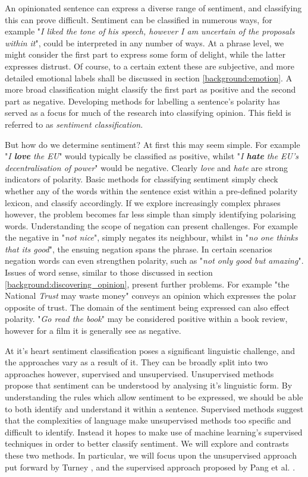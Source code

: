 An opinionated sentence can express a diverse range of sentiment, and classifying this can prove difficult. Sentiment can be classified in numerous ways, for example "\emph{I liked the tone of his speech, however I am uncertain of the proposals within it}", could be interpreted in any number of ways. At a phrase level, we might consider the first part to express some form of delight, while the latter expresses distrust. Of course, to a certain extent these are subjective, and more detailed emotional labels shall be discussed in section \ref{background:emotion}. A more broad classification might classify the first part as positive and the second part as negative. Developing methods for labelling a sentence's polarity has served as a focus for much of the research into classifying opinion. This field is referred to as \emph{sentiment classification}.

But how do we determine sentiment? At first this may seem simple. For example "\emph{I \textbf{love} the EU}" would typically be classified as positive, whilst "\emph{I \textbf{hate} the EU's decentralisation of power}" would be negative. Clearly \emph{love} and \emph{hate} are strong indicators of polarity. Basic methods for classifying sentiment simply check whether any of the words within the sentence exist within a pre-defined polarity lexicon, and classify accordingly. If we explore increasingly complex phrases however, the problem becomes far less simple than simply identifying polarising words. Understanding the scope of negation can present challenges. For example the negative in "\emph{not nice}", simply negates its neighbour, whilst in "\emph{no one thinks that its good}", the ensuing negation spans the phrase. In certain scenarios negation words can even strengthen polarity, such as "\emph{not only good but amazing}". Issues of word sense, similar to those discussed in section \ref{background:discovering_opinion}, present further problems. For example "the National \emph{Trust} may waste money" conveys an opinion which expresses the polar opposite of trust. The domain of the sentiment being expressed can also effect polarity. "\emph{Go read the book}" may be considered positive within a book review, however for a film it is generally see as negative.

At it's heart sentiment classification poses a significant linguistic challenge, and the approaches vary as a result of it. They can be broadly split into two approaches however, supervised and unsupervised. Unsupervised methods propose that sentiment can be understood by analysing it's linguistic form. By understanding the rules which allow sentiment to be expressed, we should be able to both identify and understand it within a sentence. Supervised methods suggest that the complexities of language make unsupervised methods too specific and difficult to identify. Instead it hopes to make use of machine learning's supervised techniques in order to better classify sentiment. We will explore and contrasts these two methods. In particular, we will focus upon the unsupervised approach put forward by Turney \cite{Turney:2002vv}, and the supervised approach proposed by Pang et al. \cite{Pang:2002tu}.

